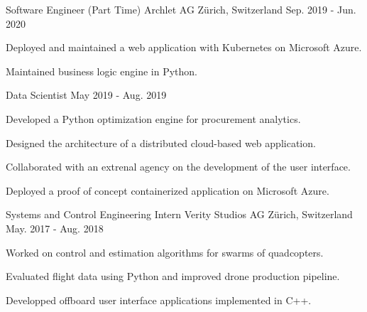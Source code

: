
\begin{cventries}

  \cventry
    {Software Engineer (Part Time)} %
    {Archlet AG} %
    {Z\"urich, Switzerland} %
    {Sep. 2019 - Jun. 2020} %
    {
      \begin{cvitems} %
        \item {Deployed and maintained a web application with Kubernetes on Microsoft Azure.}
        \item {Maintained business logic engine in Python.}
      \end{cvitems}
    }

\vspace*{-0.15cm}  
\cventry
    {Data Scientist} %
    {} %
    {} %
    {May 2019 - Aug. 2019} %
    {
      \begin{cvitems} %
        \item {Developed a Python optimization engine for procurement analytics.}
        \item {Designed the architecture of a distributed cloud-based web application.}
        \item {Collaborated with an extrenal agency on the development of the user interface.}
        \item {Deployed a proof of concept containerized application on Microsoft Azure.}
      \end{cvitems}
    }

  \cventry
    {Systems and Control Engineering Intern} %
    {Verity Studios AG} %
    {Z\"urich, Switzerland} %
    {May. 2017 - Aug. 2018} %
    {
      \begin{cvitems} %
        \item {Worked on control and estimation algorithms for swarms of quadcopters.}
        \item {Evaluated flight data using Python and improved drone production pipeline.}
        \item {Developped offboard user interface applications implemented in C++.}
      \end{cvitems}
    }


\end{cventries}

